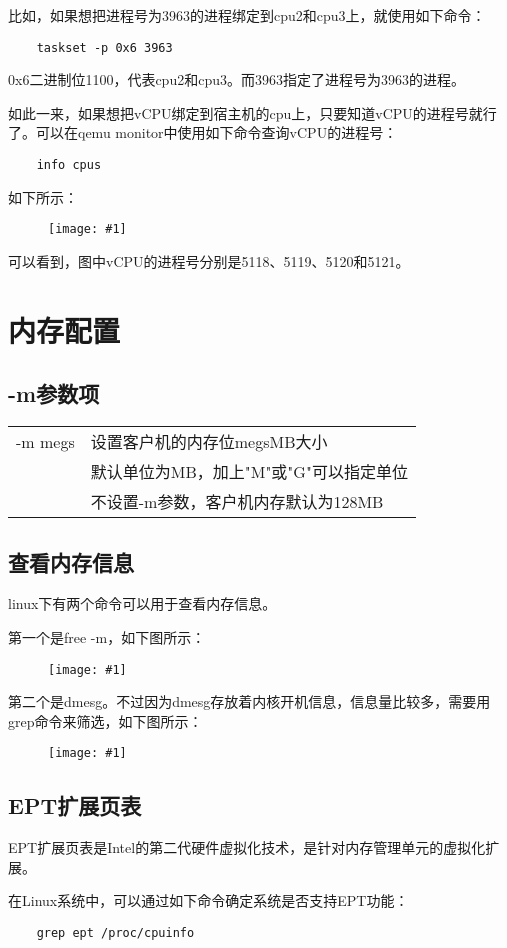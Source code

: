 \documentclass[a4paper,left=2.5cm,right=2.5cm,11pt]{article}
\newcommand{\fic}[1]{\begin{figure}[H]
		\center
		\texttt{[image: \#1]}
	\end{figure}}
\begin{document}
	比如，如果想把进程号为3963的进程绑定到cpu2和cpu3上，就使用如下命令：
	\begin{lstlisting}
	taskset -p 0x6 3963
	\end{lstlisting}

	0x6二进制位1100，代表cpu2和cpu3。而3963指定了进程号为3963的进程。\par
	如此一来，如果想把vCPU绑定到宿主机的cpu上，只要知道vCPU的进程号就行了。可以在qemu monitor中使用如下命令查询vCPU的进程号：
	\begin{lstlisting}
	info cpus
	\end{lstlisting}

	如下所示：
	\fic{3.png}

	可以看到，图中vCPU的进程号分别是5118、5119、5120和5121。

\clearpage

\section{内存配置}
\subsection{-m参数项}
\begin{longtable}{p{2cm}p{8cm}}
\hline
-m megs & 设置客户机的内存位megsMB大小 \\
	    & 默认单位为MB，加上"M"或"G"可以指定单位 \\
		& 不设置-m参数，客户机内存默认为128MB \\
\hline
\end{longtable}
\subsection{查看内存信息}
	linux下有两个命令可以用于查看内存信息。\par
	第一个是free -m，如下图所示：
	\fic{5.png}

	第二个是dmesg。不过因为dmesg存放着内核开机信息，信息量比较多，需要用grep命令来筛选，如下图所示：
	\fic{4.png}

\subsection{EPT扩展页表}
	EPT扩展页表是Intel的第二代硬件虚拟化技术，是针对内存管理单元的虚拟化扩展。\par
	在Linux系统中，可以通过如下命令确定系统是否支持EPT功能：
	\begin{lstlisting}
	grep ept /proc/cpuinfo
	\end{lstlisting}
\end{document}
